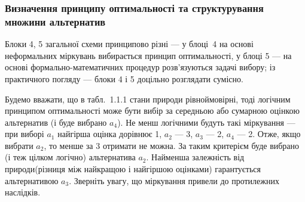 \documentclass[a4paper, 12pt]{article}
\begin{document}
\subsubsection{Визначення принципу оптимальності та структурування множини альтернатив}

Блоки 4, 5 загальної схеми принципово різні --- у блоці~4 на основі неформальних міркувань вибирається принцип оптимальності, у блоці 5 --- на основі формально-математичних процедур розв'язуються задачі вибору; із практичного погляду --- блоки 4 і 5 доцільно розглядати сумісно. \medskip

Будемо вважати, що в табл.~1.1.1 стани природи рівноймовірні, тоді логічним принципом оптимальності може бути вибір за середньою або сумарною оцінкою альтернатив (і буде вибрано $a_4$). Не менш логічними будуть такі міркування --- при виборі $a_1$ найгірша оцінка дорівнює 1, $a_2$ --- 3, $a_3$ --- 2, $a_4$ --- 2. Отже, якщо вибрати $a_2$, то менше за 3 отримати не можна. За таким критерієм буде вибрано (і теж цілком логічно) альтернатива $a_2$. Найменша залежність від  природи\guillemotright (різниця між найкращою і найгіршою оцінками) гарантується альтернативою $a_3$. Зверніть увагу, що \guillemotright міркування привели до протилежних наслідків. \medskip
\end{document}
